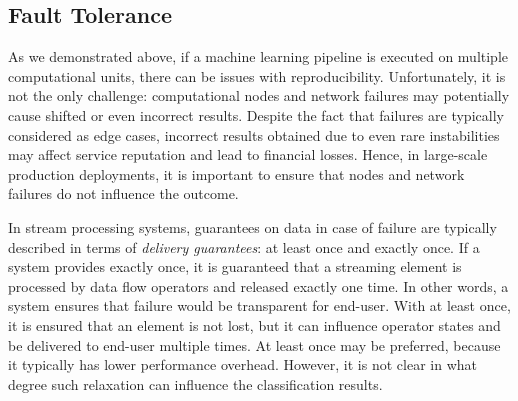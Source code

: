 \subsection{Fault Tolerance}

As we demonstrated above, if  a machine learning pipeline is executed on multiple computational units, there can be issues with reproducibility. Unfortunately, it is not the only challenge: computational nodes and network failures may potentially cause shifted or even incorrect results. Despite the fact that failures are typically considered as edge cases, incorrect results obtained due to even rare instabilities may affect service reputation and lead to financial losses. Hence, in large-scale production deployments, it is important to ensure that nodes and network failures do not influence the outcome.

In stream processing systems, guarantees on data in case of failure are typically described in terms of {\em delivery guarantees}: at least once and exactly once. If a system provides exactly once, it is guaranteed that a streaming element is processed by data flow operators and released exactly one time. In other words, a system ensures that failure would be transparent for end-user. With at least once, it is ensured that an element is not lost, but it can influence operator states and be delivered to end-user multiple times. At least once may be preferred, because it typically has lower performance overhead. However, it is not clear in what degree such relaxation can influence the classification results. 

